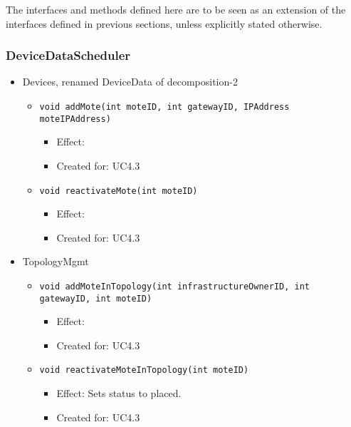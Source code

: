     The interfaces and methods defined here are to be seen as an
    extension of the interfaces defined in previous sections, unless
    explicitly stated otherwise.

    \subsubsection{DeviceDataScheduler}
        \begin{itemize}
            \item Devices, renamed DeviceData of decomposition-2
            \begin{itemize}
                \item \texttt{void addMote(int moteID, int gatewayID, IPAddress moteIPAddress)}
                    \begin{itemize}
                        \item Effect:
                        \item Created for: UC4.3
                    \end{itemize}
                \item \texttt{void reactivateMote(int moteID)}
                    \begin{itemize}
                        \item Effect:
                        \item Created for: UC4.3
                    \end{itemize}
            \end{itemize}

        	\item TopologyMgmt
        	\begin{itemize}
        		\item \texttt{void addMoteInTopology(int infrastructureOwnerID, int gatewayID, int moteID)}
        		\begin{itemize}
        			\item Effect:
        			\item Created for: UC4.3
        		\end{itemize}

                \item \texttt{void reactivateMoteInTopology(int moteID)}
                    \begin{itemize}
                        \item Effect: Sets status to placed.
                        \item Created for: UC4.3
                    \end{itemize}
        	\end{itemize}
        \end{itemize}

